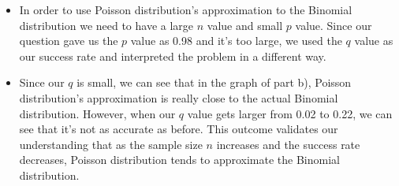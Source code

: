 \documentclass[12pt]{article}
\begin{document}
\begin{itemize}
 \item In order to use Poisson distribution’s approximation to the Binomial distribution we need to have a large $n$ value and small $p$ value. Since our question gave us the $p$ value as 0.98 and it's too large, we used the $q$ value as our success rate and interpreted the problem in a different way.
 \item Since our $q$ is small, we can see that in the graph of part b), Poisson distribution’s approximation is really close to the actual Binomial distribution. However, when our $q$ value gets larger from 0.02 to 0.22, we can see that it's not as accurate as before. This outcome validates our understanding that as the sample size $n$ increases and the success rate decreases, Poisson distribution tends to approximate the Binomial distribution.
\end{itemize}
\end{document}
